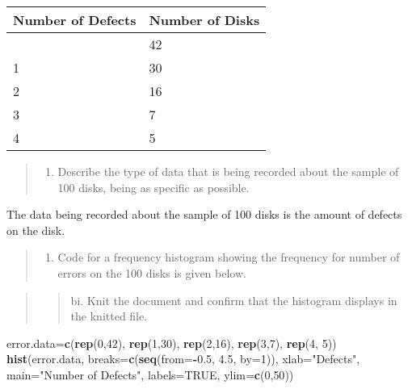 \documentclass[
]{article}
\newenvironment{Shaded}{\begin{snugshade}}{\end{snugshade}}
\newcommand{\AttributeTok}[1]{\textcolor[rgb]{0.13,0.29,0.53}{#1}}
\newcommand{\ConstantTok}[1]{\textcolor[rgb]{0.56,0.35,0.01}{#1}}
\newcommand{\DecValTok}[1]{\textcolor[rgb]{0.00,0.00,0.81}{#1}}
\newcommand{\FloatTok}[1]{\textcolor[rgb]{0.00,0.00,0.81}{#1}}
\newcommand{\FunctionTok}[1]{\textcolor[rgb]{0.13,0.29,0.53}{\textbf{#1}}}
\newcommand{\NormalTok}[1]{#1}
\newcommand{\OtherTok}[1]{\textcolor[rgb]{0.56,0.35,0.01}{#1}}
\newcommand{\SpecialCharTok}[1]{\textcolor[rgb]{0.81,0.36,0.00}{\textbf{#1}}}
\newcommand{\StringTok}[1]{\textcolor[rgb]{0.31,0.60,0.02}{#1}}
\providecommand{\tightlist}{%
  \setlength{\itemsep}{0pt}\setlength{\parskip}{0pt}}
\begin{document}
\begin{longtable}[]{@{}ll@{}}
\toprule\noalign{}
Number of Defects & Number of Disks \\
\midrule\noalign{}
\endhead
\bottomrule\noalign{}
\endlastfoot
0 & 42 \\
1 & 30 \\
2 & 16 \\
3 & 7 \\
4 & 5 \\
\end{longtable}

\begin{quote}
\begin{enumerate}
\def\labelenumi{\alph{enumi}.}
\tightlist
\item
  Describe the type of data that is being recorded about the sample of
  100 disks, being as specific as possible.
\end{enumerate}
\end{quote}

The data being recorded about the sample of 100 disks is the amount of
defects on the disk.

\begin{quote}
\begin{enumerate}
\def\labelenumi{\alph{enumi}.}
\setcounter{enumi}{1}
\tightlist
\item
  Code for a frequency histogram showing the frequency for number of
  errors on the 100 disks is given below.
\end{enumerate}
\end{quote}

\begin{quote}
\begin{quote}
bi. Knit the document and confirm that the histogram displays in the
knitted file.
\end{quote}
\end{quote}

\begin{Shaded}
\begin{Highlighting}[]
\NormalTok{error.data}\OtherTok{=}\FunctionTok{c}\NormalTok{(}\FunctionTok{rep}\NormalTok{(}\DecValTok{0}\NormalTok{,}\DecValTok{42}\NormalTok{), }\FunctionTok{rep}\NormalTok{(}\DecValTok{1}\NormalTok{,}\DecValTok{30}\NormalTok{), }\FunctionTok{rep}\NormalTok{(}\DecValTok{2}\NormalTok{,}\DecValTok{16}\NormalTok{), }\FunctionTok{rep}\NormalTok{(}\DecValTok{3}\NormalTok{,}\DecValTok{7}\NormalTok{), }\FunctionTok{rep}\NormalTok{(}\DecValTok{4}\NormalTok{, }\DecValTok{5}\NormalTok{))}
\FunctionTok{hist}\NormalTok{(error.data, }\AttributeTok{breaks=}\FunctionTok{c}\NormalTok{(}\FunctionTok{seq}\NormalTok{(}\AttributeTok{from=}\SpecialCharTok{{-}}\FloatTok{0.5}\NormalTok{, }\FloatTok{4.5}\NormalTok{, }\AttributeTok{by=}\DecValTok{1}\NormalTok{)), }
     \AttributeTok{xlab=}\StringTok{"Defects"}\NormalTok{, }\AttributeTok{main=}\StringTok{"Number of Defects"}\NormalTok{, }
     \AttributeTok{labels=}\ConstantTok{TRUE}\NormalTok{, }\AttributeTok{ylim=}\FunctionTok{c}\NormalTok{(}\DecValTok{0}\NormalTok{,}\DecValTok{50}\NormalTok{))}
\end{Highlighting}
\end{Shaded}
\end{document}
